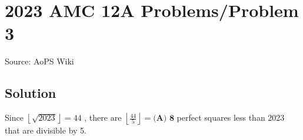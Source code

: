 \documentclass[12pt]{article}
\begin{document}
\section*{{2023 AMC 12A Problems/Problem 3}}
Source: AoPS Wiki

\subsection*{Solution}
Since $\left \lfloor{\sqrt{2023}}\right \rfloor = 44$ , there are $\left \lfloor{\frac{44}{5}}\right \rfloor = \boxed{\textbf{(A) 8}}$ perfect squares less than 2023 that are divisible by 5.
\end{document}
